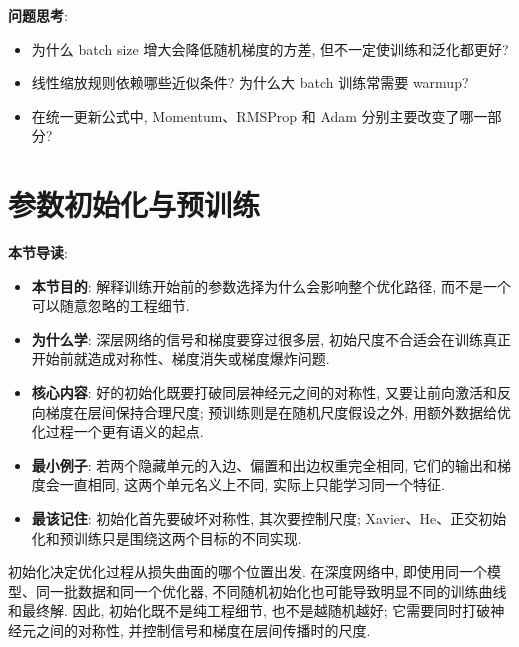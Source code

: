 \documentclass{../nndlcourse}
\begin{document}
\textbf{问题思考}:
\begin{itemize}
  \item 为什么 batch size 增大会降低随机梯度的方差, 但不一定使训练和泛化都更好?
  \item 线性缩放规则依赖哪些近似条件? 为什么大 batch 训练常需要 warmup?
  \item 在统一更新公式中, Momentum、RMSProp 和 Adam 分别主要改变了哪一部分?
\end{itemize}

\section{参数初始化与预训练}

\textbf{本节导读}:
\begin{itemize}
  \item \textbf{本节目的}: 解释训练开始前的参数选择为什么会影响整个优化路径, 而不是一个可以随意忽略的工程细节.
  \item \textbf{为什么学}: 深层网络的信号和梯度要穿过很多层, 初始尺度不合适会在训练真正开始前就造成对称性、梯度消失或梯度爆炸问题.
  \item \textbf{核心内容}: 好的初始化既要打破同层神经元之间的对称性, 又要让前向激活和反向梯度在层间保持合理尺度; 预训练则是在随机尺度假设之外, 用额外数据给优化过程一个更有语义的起点.
  \item \textbf{最小例子}: 若两个隐藏单元的入边、偏置和出边权重完全相同, 它们的输出和梯度会一直相同, 这两个单元名义上不同, 实际上只能学习同一个特征.
  \item \textbf{最该记住}: 初始化首先要破坏对称性, 其次要控制尺度; Xavier、He、正交初始化和预训练只是围绕这两个目标的不同实现.
\end{itemize}

初始化决定优化过程从损失曲面的哪个位置出发. 在深度网络中, 即使用同一个模型、同一批数据和同一个优化器, 不同随机初始化也可能导致明显不同的训练曲线和最终解. 因此, 初始化既不是纯工程细节, 也不是越随机越好; 它需要同时打破神经元之间的对称性, 并控制信号和梯度在层间传播时的尺度.
\end{document}

